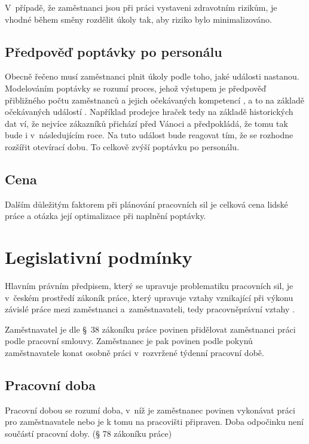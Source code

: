 \documentclass[twoside]{ctuthesis}
\begin{document}
V~případě, že zaměstnanci jsou při práci vystaveni zdravotním rizikům, je vhodné během směny rozdělit úkoly tak, aby riziko bylo minimalizováno. \cite{wongwien2013ergonomic}


\subsection{Předpověď poptávky po personálu}
\label{sub:demand}
Obecně řečeno musí zaměstnanci plnit úkoly podle toho, jaké události nastanou. Modelováním poptávky se rozumí proces, jehož výstupem je předpověď přibližného počtu zaměstnanců a jejich očekávaných kompetencí \cite[s.~219]{armstrong2014}, a to na základě očekávaných událostí \cite{ernst2004staff}.
Například prodejce hraček tedy na základě historických dat ví, že nejvíce zákazníků přichází před Vánoci a předpokládá, že tomu tak bude i v~následujícím roce. Na tuto událost bude reagovat tím, že se rozhodne rozšířit otevírací dobu. To celkově zvýší poptávku po personálu.

\subsection{Cena}
Dalším důležitým faktorem při plánování pracovních sil je celková cena lidské práce a otázka její optimalizace při naplnění poptávky.


\section{Legislativní podmínky}
\label{section:legislativa}
Hlavním právním předpisem, který se upravuje problematiku pracovních sil, je v~českém prostředí zákoník práce, který upravuje vztahy vznikající při výkonu závislé práce mezi zaměstnanci a~zaměstnavateli, tedy pracovněprávní vztahy \cite{zakon06_262}.

Zaměstnavatel je dle §~38 zákoníku práce povinen přidělovat zaměstnanci práci podle pracovní smlouvy. Zaměstnanec je pak povinen podle pokynů zaměstnavatele konat osobně práci v~rozvržené týdenní pracovní době.

\subsection{Pracovní doba}
Pracovní dobou se rozumí doba, v~níž je zaměstnanec povinen vykonávat práci pro zaměstnavatele nebo je k tomu na pracovišti připraven. Doba odpočinku není součástí pracovní doby. (§ 78 zákoníku práce)
\end{document}
